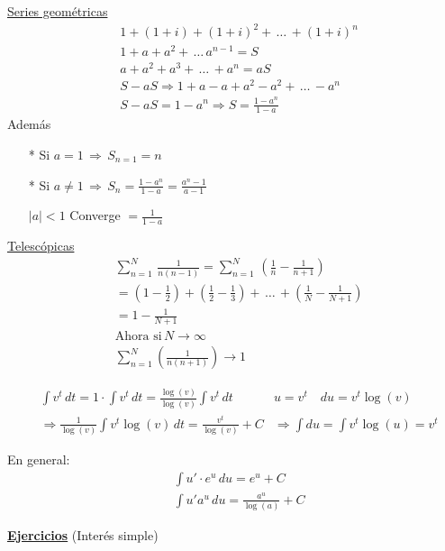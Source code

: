 \hfill

\begin{multicols}{2}
\underline{Series geométricas} 
\begin{align*}
& 1 + (1+i) +(1+i)^2 + \, \ldots \, + (1+i)^n\\
& 1 + a + a^2 + \, \ldots \, a^{n-1} = S\\
& a + a^2 + a ^3 + \, \ldots \, + a^n = aS\\
& S - aS \Longrightarrow 1 + a - a + a^2 - a^2 + \, \ldots \, - a^n\\
& S - aS = 1-a^n
\Longrightarrow S = \frac{1-a^n}{1-a}
\end{align*}
Además
\begin{itemize}
\item[*] Si $a=1\, \Longrightarrow \, S_{n=1} = n$
\item[*] Si $a\neq 1\, \Longrightarrow \, S_n = \frac{1-a^n}{1-a} = \frac{a^n-1}{a-1}$

$|a|<1$ Converge $= \frac{1}{1-a}$
\end{itemize}
\columnbreak
\underline{Telescópicas}
\begin{align*}
&\sum_{n=1}^{N} \, \frac{1}{n(n-1)} = \sum_{n=1}^{N} \, \left(\frac{1}{n} -\frac{1}{n+1} \right) \\
& = \left(1-\frac{1}{2} \right) + \left(\frac{1}{2} - \frac{1}{3}\right) +\, \ldots \, + \left(\frac{1}{N} - \frac{1}{N+1}\right)\\
& = 1- \frac{1}{N+1}\\
& \text{Ahora si} \, N \longrightarrow \infty\\
& \sum_{n=1}^{N}\left(\frac{1}{n(n+1)} \right) \longrightarrow 1 
\end{align*}
\end{multicols}

\hfill

\begin{remark}
\begin{align*}
&\int v^t \, dt = 1 \cdot \int v^t \, dt = \frac{\log (v)}{\log (v)}\int v^t \, dt & u = v^t \quad du = v^t \log(v)\\
&\Longrightarrow \frac{1}{\log (v)}\int v^t\log(v) \, dt =\frac{v^t}{\log(v)} + C & \Longrightarrow \int du = \int v^t \log(u) = v^t
\end{align*}

En general: 
\begin{align*}
& \int u'\cdot e^{u}\, du = e^{u} + C \\
& \int u'a^{u} \, du = \frac{a^{u}}{\log(a)} + C 
\end{align*}
\end{remark}
\newpage
\textbf{\underline{Ejercicios} }(Interés simple)

